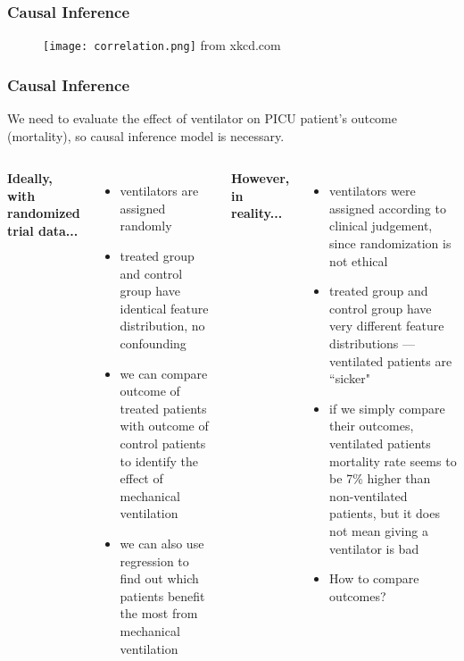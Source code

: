 \documentclass{beamer}
\begin{document}
\begin{frame}
\frametitle{Causal Inference}
\begin{figure}
\texttt{[image: correlation.png]}
\newline from xkcd.com
\end{figure}
\end{frame}

\begin{frame}
\frametitle{Causal Inference}
We need to evaluate the effect of ventilator on PICU patient's outcome (mortality), so causal inference model is necessary.
\newline 
\begin{columns}[c] %
\fontsize{4mm}{4mm}\selectfont
\pause
\textbf{Ideally, with randomized trial data...}
\begin{itemize}
\pause
\fontsize{3mm}{4mm}\selectfont
\item ventilators are assigned randomly
\item treated group and control group have identical feature distribution, no confounding
\pause
\item we can compare outcome of treated patients with outcome of control patients to identify the effect of mechanical ventilation
\item we can also use regression to find out which patients benefit the most from mechanical ventilation
\end{itemize}
\pause
{} %
\textbf{However, in reality...}
\begin{itemize}
\fontsize{3mm}{4mm}\selectfont
\item ventilators were assigned according to clinical judgement, since randomization is not ethical
\item treated group and control group have very different feature distributions
\pause
---ventilated patients are ``sicker"
\pause
\item if we simply compare their outcomes, ventilated patients mortality rate seems to be 7\% higher than non-ventilated patients, but it does not mean giving a ventilator is bad
\pause 
\item How to compare outcomes?
\end{itemize}
\end{columns}
\end{frame}
\end{document}
